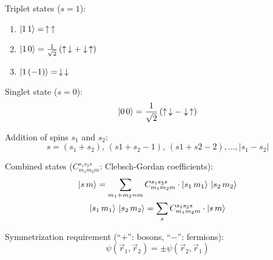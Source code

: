 \documentclass[fontsize=11pt,a4paper]{scrartcl}
\begin{document}
Triplet states ($s=1$):
\begin{enumerate}
	\item $\ket{1\,1} = \,\uparrow\,\uparrow$
	\item $\ket{1\,0} = \frac{1}{\sqrt{2}}\left(\uparrow\,\downarrow+\downarrow\,\uparrow\right)$
	\item $\ket{1\,(-1)} = \,\downarrow\,\downarrow$
\end{enumerate}

Singlet state ($s=0$):
\[
	\ket{0\,0} = \frac{1}{\sqrt{2}}\left(\uparrow\,\downarrow-\downarrow\,\uparrow\right)
\]

Addition of spins $s_1$ and $s_2$:
\[
	s=(s_1+s_2),\,(s1+s_2-1),\,(s1+s2-2),\dots,|s_1-s_2|
\]

Combined states ($C_{m_1 m_2 m}^{s_1 s_2 s}$: Clebsch-Gordan coefficients):
\begin{gather*}
	\ket{s\,m}=\sum_{m_1+m_2=m} C_{m_1 m_2 m}^{s_1 s_2 s}\cdot\ket{s_1\,m_1}\,\ket{s_2\,m_2}\\
	\ket{s_1\,m_1}\,\ket{s_2\,m_2}=\sum_s C_{m_1 m_2 m}^{s_1 s_2 s}\cdot\ket{s\,m}
\end{gather*}

Symmetrization requirement (``$+$'': bosons, ``$-$'': fermions):
\[
	\psi(\vec r_1,\vec r_2)=\pm\psi(\vec r_2,\vec r_1)
\]
\end{document}
